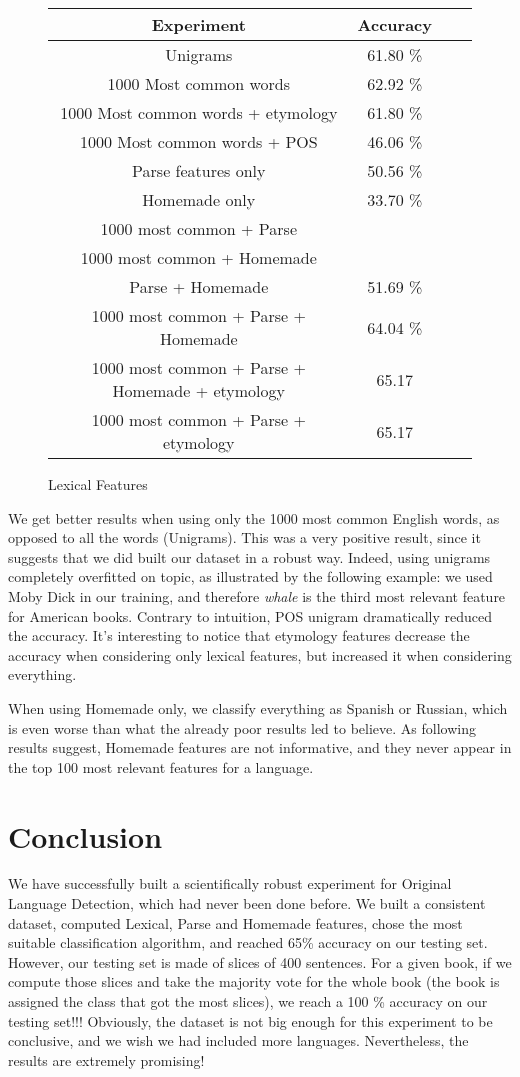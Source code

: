 \documentclass[10pt]{article}
\begin{document}
\begin{figure}[h]
\centering\begin{tabular}{|c|c|c|c|}
\hline 
Experiment & Accuracy \\
\hline 
Unigrams & 61.80 \% \\
1000 Most common words & 62.92 \%  \\
1000 Most common words + etymology & 61.80 \%  \\
1000 Most common words + POS & 46.06 \%  \\
\hline
Parse features only & 50.56 \%\\
\hline
Homemade only & 33.70 \%\\
\hline
1000 most common + Parse & \\
1000 most common + Homemade & \\
Parse + Homemade & 51.69 \%\\
\hline
1000 most common + Parse + Homemade & 64.04 \% \\
1000 most common + Parse + Homemade + etymology & 65.17 \\
1000 most common + Parse + etymology & 65.17 \\
\hline
\end{tabular}
\caption{Lexical Features}
\end{figure}
We get better results when using only the 1000 most common English words, as opposed to all the words (Unigrams). This was a very positive result, since it suggests that we did built our dataset in a robust way. Indeed, using unigrams completely overfitted on topic, as illustrated by the following example: we used Moby Dick in our training, and therefore \emph{whale} is the third most relevant feature for American books. Contrary to intuition, POS unigram dramatically reduced the accuracy. It's interesting to notice that etymology features decrease the accuracy when considering only lexical features, but increased it when considering everything.


When using Homemade only, we classify everything as Spanish or Russian, which is even worse than what the already poor results led to believe. As following results suggest, Homemade features are not informative, and they never appear in the top 100 most relevant features for a language.


\section{Conclusion}
We have successfully built a scientifically robust experiment for Original Language Detection, which had never been done before. We built a consistent dataset, computed Lexical, Parse and Homemade features, chose the most suitable classification algorithm, and reached 65\% accuracy on our testing set. However, our testing set is made of slices of 400 sentences. For a given book, if we compute those slices and take the majority vote for the whole book (the book is assigned the class that got the most slices), we reach a 100 \% accuracy on our testing set!!! Obviously, the dataset is not big enough for this experiment to be conclusive, and we wish we had included more languages. Nevertheless, the results are extremely promising!



\end{document}
